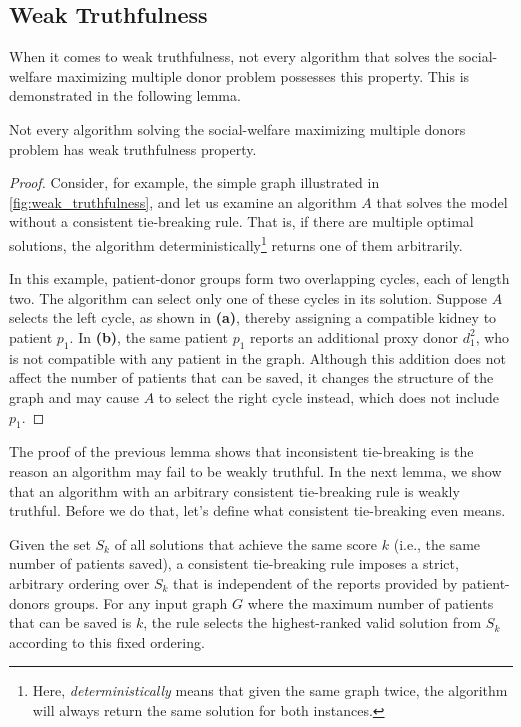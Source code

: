 \subsection{Weak Truthfulness}
When it comes to weak truthfulness, not every algorithm that solves the social-welfare maximizing multiple donor problem possesses this property. This is demonstrated in the following lemma.

\begin{lemma}
\label{lemma:weak_truthfulness_false}
    Not every algorithm solving the social-welfare maximizing multiple donors problem has weak truthfulness property.
    \begin{proof}
        Consider, for example, the simple graph illustrated in \autoref{fig:weak_truthfulness}, and let us examine an algorithm $A$ that solves the model without a consistent tie-breaking rule. That is, if there are multiple optimal solutions, the algorithm deterministically\footnote{Here, \textit{deterministically} means that given the same graph twice, the algorithm will always return the same solution for both instances.} returns one of them arbitrarily.
    
        In this example, patient-donor groups form two overlapping cycles, each of length two. The algorithm can select only one of these cycles in its solution. Suppose $A$ selects the left cycle, as shown in \textbf{(a)}, thereby assigning a compatible kidney to patient $p_1$. In \textbf{(b)}, the same patient $p_1$ reports an additional proxy donor $d_1^2$, who is not compatible with any patient in the graph. Although this addition does not affect the number of patients that can be saved, it changes the structure of the graph and may cause $A$ to select the right cycle instead, which does not include $p_1$.
    \end{proof}
\end{lemma}

The proof of the previous lemma shows that inconsistent tie-breaking is the reason an algorithm may fail to be weakly truthful. In the next lemma, we show that an algorithm with an arbitrary consistent tie-breaking rule is weakly truthful. Before  we do that, let's define what consistent tie-breaking even means.

\begin{definition}
\label{consistent_tie_breaking_rule}
    Given the set $S_k$ of all solutions that achieve the same score $k$ (i.e., the same number of patients saved), a consistent tie-breaking rule imposes a strict, arbitrary ordering over $S_k$ that is independent of the reports provided by patient-donors groups. For any input graph $G$ where the maximum number of patients that can be saved is $k$, the rule selects the highest-ranked valid solution from $S_k$ according to this fixed ordering.
\end{definition}

